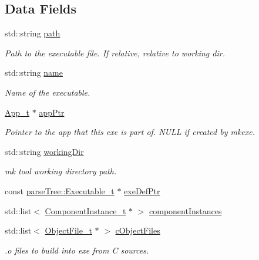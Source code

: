 \subsection*{Data Fields}
\begin{DoxyCompactItemize}
\item 
std\+::string \hyperlink{struct_exe__t_a5f311cf3cbce5d5bc6530ea23a56a1ee}{path}
\begin{DoxyCompactList}\small\item\em Path to the executable file. If relative, relative to working dir. \end{DoxyCompactList}\item 
std\+::string \hyperlink{struct_exe__t_adf6873ec528b52a18ccc584d14aab672}{name}
\begin{DoxyCompactList}\small\item\em Name of the executable. \end{DoxyCompactList}\item 
\hyperlink{struct_app__t}{App\+\_\+t} $\ast$ \hyperlink{struct_exe__t_a740d3033ba4d073c992ebcb2c2f001e7}{app\+Ptr}
\begin{DoxyCompactList}\small\item\em Pointer to the app that this exe is part of. N\+U\+LL if created by mkexe. \end{DoxyCompactList}\item 
std\+::string \hyperlink{struct_exe__t_aabb64244de93a7b0f75134a12c445874}{working\+Dir}
\begin{DoxyCompactList}\small\item\em mk tool working directory path. \end{DoxyCompactList}\item 
const \hyperlink{structparse_tree_1_1_executable__t}{parse\+Tree\+::\+Executable\+\_\+t} $\ast$ \hyperlink{struct_exe__t_a2786cb44eee3961b9dded6d769dedd6a}{exe\+Def\+Ptr}
\item 
std\+::list$<$ \hyperlink{struct_component_instance__t}{Component\+Instance\+\_\+t} $\ast$ $>$ \hyperlink{struct_exe__t_ad0715708a0dcefcebb76093eb85f6c08}{component\+Instances}
\item 
std\+::list$<$ \hyperlink{struct_object_file__t}{Object\+File\+\_\+t} $\ast$ $>$ \hyperlink{struct_exe__t_a7a0ed7a9fec67f4f2af650d64e502704}{c\+Object\+Files}
\begin{DoxyCompactList}\small\item\em .o files to build into exe from C sources. \end{DoxyCompactList}\item 

\end{DoxyCompactItemize}
